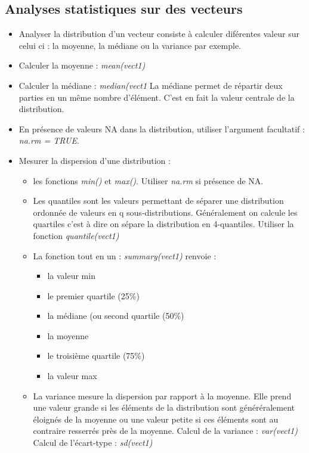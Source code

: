 \documentclass[12pt,a4paper]{article}
\begin{document}
\subsection{Analyses statistiques sur des vecteurs}
\begin{itemize}
\item Analyser la distribution d'un vecteur consiste à calculer diférentes valeur sur celui ci : la moyenne, la médiane ou la variance par exemple.
\item Calculer la moyenne : \textit{mean(vect1)}
\item Calculer la médiane : \textit{median(vect1}
\newline La médiane permet de répartir deux parties en un même nombre d'élément. C'est en fait la valeur centrale de la distribution.
\item En présence de valeurs NA dans la distribution, utiliser l'argument facultatif : \textit{na.rm = TRUE}.
\item Mesurer la dispersion d'une distribution : 
\begin{itemize}
\item les fonctions \textit{min()} et \textit{max()}. Utiliser \textit{na.rm} si présence de NA.
\item Les quantiles sont les valeurs permettant de séparer une distribution ordonnée de valeurs en q sous-distributions.
\newline Généralement on calcule les quartiles c'est à dire on sépare la distribution en 4-quantiles.
\newline Utiliser la fonction \textit{quantile(vect1)}
\item La fonction tout en un : \textit{summary(vect1)} renvoie :
\begin{itemize}
\item la valeur min
\item le premier quartile (25\%)
\item la médiane (ou second quartile (50\%)
\item la moyenne
\item le troisième quartile (75\%)
\item la valeur max
\end{itemize}
\item La variance mesure la dispersion par rapport à la moyenne. Elle prend une valeur grande si les éléments de la distribution sont généréralement éloignés de la moyenne ou une valeur petite si ces éléments sont au contraire resserrés près de la moyenne.
\newline Calcul de la variance : \textit{var(vect1)}
\newline Calcul de l'écart-type : \textit{sd(vect1)}
\end{itemize}
\end{itemize}
\end{document}

